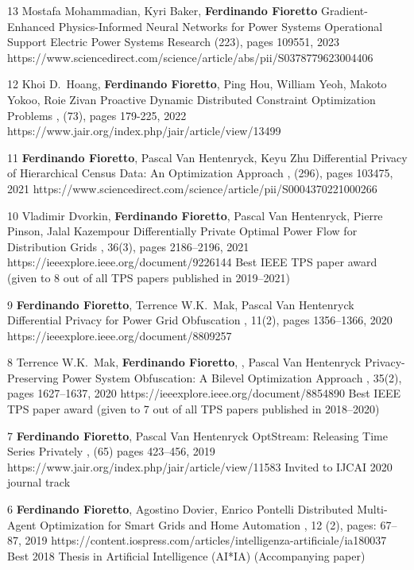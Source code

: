 \begin{pubs}

	\journalentry
	{13}
	{Mostafa Mohammadian, Kyri Baker, \textbf{Ferdinando Fioretto}}
	{Gradient-Enhanced Physics-Informed Neural Networks for Power Systems Operational Support}
	{Electric Power Systems Research (223), pages 109551, 2023}
	{https://www.sciencedirect.com/science/article/abs/pii/S0378779623004406}

	\journalentry
	{12} %
	{Khoi D.~Hoang, \textbf{Ferdinando Fioretto}, Ping Hou, William Yeoh, Makoto Yokoo, Roie Zivan}
	{Proactive Dynamic Distributed Constraint Optimization Problems}
	{\JAIR, (73), pages 179-225, 2022}
	{https://www.jair.org/index.php/jair/article/view/13499}

	\journalentry
	{11} %
		{\textbf{Ferdinando Fioretto}, Pascal Van Hentenryck, Keyu Zhu}
		{Differential Privacy of Hierarchical Census Data: An Optimization Approach}
		{\AIJ, (296), pages 103475, 2021}
		{https://www.sciencedirect.com/science/article/pii/S0004370221000266}

	\journalentryAwd
	{10} %
		{Vladimir Dvorkin, {\bf Ferdinando Fioretto}, Pascal Van Hentenryck, Pierre Pinson, Jalal Kazempour}
		{Differentially Private Optimal Power Flow for Distribution Grids}
		{\TPS, 36(3), pages 2186--2196, 2021}
		{https://ieeexplore.ieee.org/document/9226144}
		{Best IEEE TPS paper award}
		{(given to 8 out of all TPS papers published in 2019--2021)}

	\journalentry
	{9} %
		{{\bf Ferdinando Fioretto}, Terrence W.K.~Mak, Pascal Van Hentenryck}
		{Differential Privacy for Power Grid Obfuscation}
		{\TSG, 11(2), pages 1356--1366, 2020}
		{https://ieeexplore.ieee.org/document/8809257}

	\journalentryAwd
	{8}	%
		{Terrence W.K.~Mak, {\bf Ferdinando Fioretto}, , Pascal Van Hentenryck}
		{Privacy-Preserving Power System Obfuscation: A Bilevel Optimization Approach}
		{\TPS, 35(2), pages 1627--1637, 2020}
		{https://ieeexplore.ieee.org/document/8854890}
		{Best IEEE TPS paper award}
		{(given to 7 out of all TPS papers published in 2018--2020)}

	\journalentryAwd
	{7}	%
		{{\bf Ferdinando Fioretto}, Pascal Van Hentenryck}
		{OptStream: Releasing Time Series Privately}
		{\JAIR, (65) pages 423--456, 2019}
		{https://www.jair.org/index.php/jair/article/view/11583}
		{Invited to IJCAI 2020 journal track}
		{}

	\journalentryAwd
	{6}	%
		{{\bf Ferdinando Fioretto}, Agostino Dovier, Enrico Pontelli}
		{Distributed Multi-Agent Optimization for Smart Grids and Home Automation}
		{,  12 (2), pages: 67--87, 2019}
		{https://content.iospress.com/articles/intelligenza-artificiale/ia180037}
		{Best 2018 Thesis in Artificial Intelligence (AI*IA)}
		{(Accompanying paper)}


\end{pubs}
